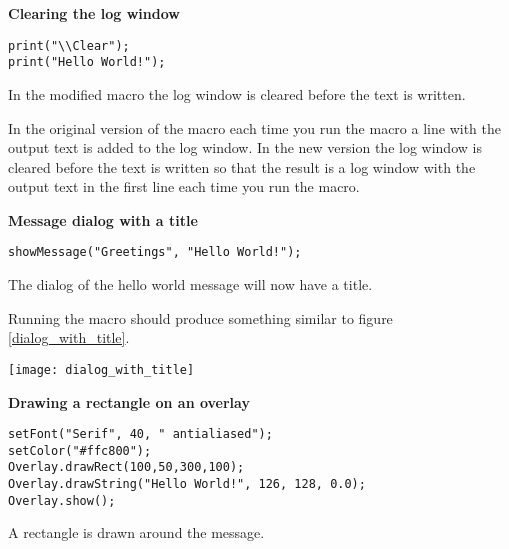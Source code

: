 \begin{ExerciseList}
\Answer[ref={ex_2_1}]

{\bf Clearing the log window}

\begin{listing}[H]
\begin{verbatim}
print("\\Clear");
print("Hello World!");
\end{verbatim}
\caption{In the modified macro the log window is cleared before the text is written.}
\label{lst:clear_log_window}
\end{listing}

In the original version of the macro each time you run the macro a line with the output text is added to the log window. In the new version the log window is cleared before the text is written so that the result is a log window with the output text in the first line each time you run the macro.

\Answer[ref={ex_2_2}]

{\bf Message dialog with a title}

\begin{listing}[H]
\begin{verbatim}
showMessage("Greetings", "Hello World!");
\end{verbatim}
\caption{The dialog of the hello world message will now have a title.}
\label{lst:dialog_with_title}
\end{listing}

Running the macro should produce something similar to figure \ref{dialog_with_title}.

\begin{center}
    \texttt{[image: dialog\_with\_title]}
    \label{dialog_with_title}
\end{center}

\Answer[ref={ex_2_3}]

{\bf Drawing a rectangle on an overlay}

\begin{listing}[H]
\begin{verbatim}
setFont("Serif", 40, " antialiased");
setColor("#ffc800");
Overlay.drawRect(100,50,300,100);
Overlay.drawString("Hello World!", 126, 128, 0.0);
Overlay.show();
\end{verbatim}
\caption{A rectangle is drawn around the message.}
\label{lst:hello_world_rectangle}
\end{listing}


\end{ExerciseList}

